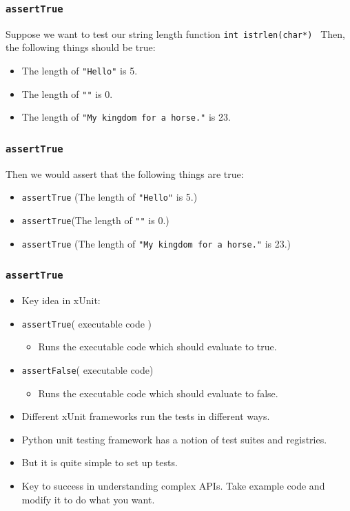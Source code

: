 \documentclass{beamer}
\begin{document}
\begin{frame}
  \frametitle{{\tt assertTrue}}
 Suppose we want to test our string length function {\tt int
   istrlen(char*) }
Then, the following things should be true:
\begin{itemize}
\item The length of {\tt "Hello"} is 5.
\item The length of {\tt ""} is 0.
\item The length of {\tt "My kingdom for a horse."} is 23.
\end{itemize}
\end{frame}
\begin{frame}
  \frametitle{{\tt assertTrue}}
Then we would assert that the following things are true:
\begin{itemize}
\item {\tt assertTrue} (The length of {\tt "Hello"} is 5.)
\item  {\tt assertTrue}(The length of {\tt ""} is 0.)
\item  {\tt assertTrue} (The length of {\tt "My kingdom for a horse."}
  is 23.)
\end{itemize}
\end{frame}

\begin{frame}
  \frametitle{{\tt assertTrue}}
  \begin{itemize}
  \item Key idea in xUnit:
  \item {\tt assertTrue}( executable code )
    \begin{itemize}
    \item  Runs the executable code which should evaluate to true.
    \end{itemize}
  \item {\tt assertFalse}( executable code)

    \begin{itemize}
  \item Runs the executable code which should evaluate to false. 
\end{itemize}
    \end{itemize}
\end{frame}
\begin{frame}
  \begin{itemize}
  \item Different xUnit frameworks run the tests in different
  ways. 
\item Python unit testing framework has a notion of test suites and
  registries.
\item But it is quite simple to set up tests.
\item  Key to success in understanding complex APIs. Take example code
  and modify it to do what you want. 
  \end{itemize}
\end{frame}
\end{document}
